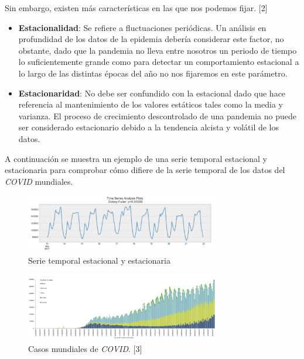 \documentclass[12pt,a4paper, xcolor=table]{article}
\begin{document}
        Sin embargo, existen más características en las que nos podemos fijar. [2]
    \begin{itemize}
    \item \textbf{Estacionalidad}: Se refiere a fluctuaciones periódicas. Un análisis en profundidad de los datos de la epidemia debería considerar este factor, no obstante, dado que la pandemia no lleva entre nosotros un periodo de tiempo lo suficientemente grande como para detectar un comportamiento estacional a lo largo de las distintas épocas del año no nos fijaremos en este parámetro.
    \item \textbf{Estacionaridad}: No debe ser confundido con la estacional dado que hace referencia al mantenimiento de los valores estáticos tales como la media y varianza. El proceso de crecimiento descontrolado de una pandemia no puede ser considerado estacionario debido a la tendencia alcista y volátil de los datos.
    \end{itemize}

    A continuación se muestra un ejemplo de una serie temporal estacional y estacionaria para comprobar cómo difiere de la serie temporal de los datos del \textit{COVID} mundiales.

        \begin{figure}[h]
                \centering
                \includegraphics[width=320px]{img/estacional.png}
                \caption{Serie temporal estacional y estacionaria}
                \label{fig:graf_exp1}
            \end{figure}


        \begin{figure}[h]
                \centering
                \includegraphics[width=320px]{img/covid-cases.png}
                \caption{Casos mundiales de \textit{COVID}. [3]}
                \label{fig:graf_exp1}
            \end{figure}
\end{document}
